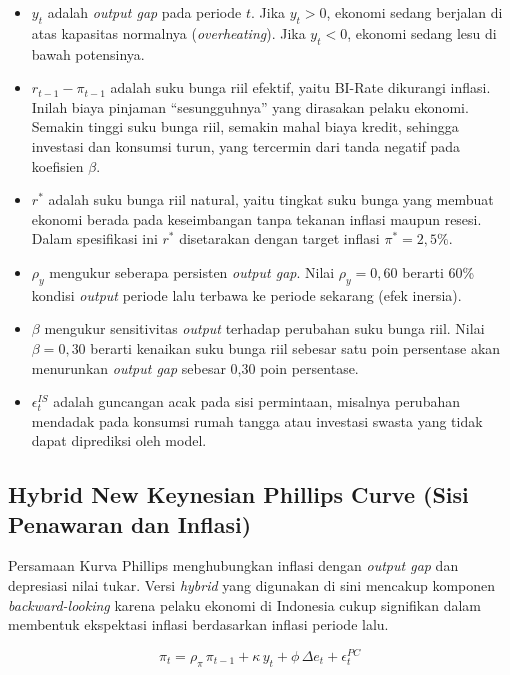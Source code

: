 \begin{itemize}
    \item $y_t$ adalah \textit{output gap} pada periode $t$. Jika $y_t > 0$, ekonomi sedang berjalan di atas kapasitas normalnya (\textit{overheating}). Jika $y_t < 0$, ekonomi sedang lesu di bawah potensinya.
    \item $r_{t-1} - \pi_{t-1}$ adalah suku bunga riil efektif, yaitu BI-Rate dikurangi inflasi. Inilah biaya pinjaman ``sesungguhnya'' yang dirasakan pelaku ekonomi. Semakin tinggi suku bunga riil, semakin mahal biaya kredit, sehingga investasi dan konsumsi turun, yang tercermin dari tanda negatif pada koefisien $\beta$.
    \item $r^{*}$ adalah suku bunga riil natural, yaitu tingkat suku bunga yang membuat ekonomi berada pada keseimbangan tanpa tekanan inflasi maupun resesi. Dalam spesifikasi ini $r^{*}$ disetarakan dengan target inflasi $\pi^{*} = 2,5\%$.
    \item $\rho_y$ mengukur seberapa persisten \textit{output gap}. Nilai $\rho_y = 0,60$ berarti 60\% kondisi \textit{output} periode lalu terbawa ke periode sekarang (efek inersia).
    \item $\beta$ mengukur sensitivitas \textit{output} terhadap perubahan suku bunga riil. Nilai $\beta = 0,30$ berarti kenaikan suku bunga riil sebesar satu poin persentase akan menurunkan \textit{output gap} sebesar 0,30 poin persentase.
    \item $\epsilon_t^{IS}$ adalah guncangan acak pada sisi permintaan, misalnya perubahan mendadak pada konsumsi rumah tangga atau investasi swasta yang tidak dapat diprediksi oleh model.
\end{itemize}

\subsection{Hybrid New Keynesian Phillips Curve (Sisi Penawaran dan Inflasi)}

Persamaan Kurva Phillips menghubungkan inflasi dengan \textit{output gap} dan depresiasi nilai tukar. Versi \textit{hybrid} yang digunakan di sini mencakup komponen \textit{backward-looking} karena pelaku ekonomi di Indonesia cukup signifikan dalam membentuk ekspektasi inflasi berdasarkan inflasi periode lalu.

\[
    \pi_t = \rho_\pi \, \pi_{t-1} + \kappa \, y_t + \phi \, \Delta e_t + \epsilon_t^{PC}
\]

